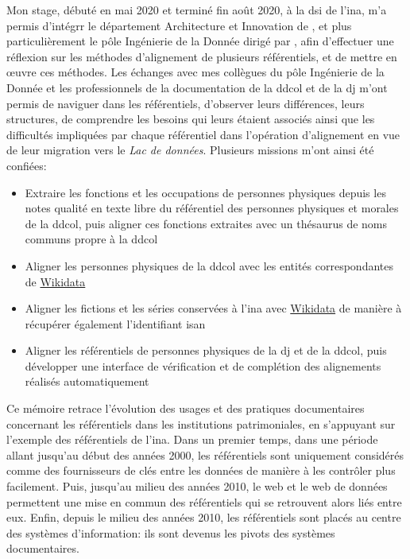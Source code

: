 Mon stage, débuté en mai 2020 et terminé fin août 2020, à la \ac{dsi} de l'\ac{ina}, m'a permis d'intégrr le département \og Architecture et Innovation\fg{} de , et plus particulièrement le pôle \og Ingénierie de la Donnée\fg{} dirigé par , afin d'effectuer une réflexion sur les méthodes d'alignement de plusieurs référentiels, et de mettre en œuvre ces méthodes. Les échanges avec mes collègues du pôle \og Ingénierie de la Donnée\fg{} et les professionnels de la documentation de la \ac{ddcol} et de la \ac{dj} m'ont permis de naviguer dans les référentiels, d'observer leurs différences, leurs structures, de comprendre les besoins qui leurs étaient associés ainsi que les difficultés impliquées par chaque référentiel dans l'opération d'alignement en vue de leur migration vers le \textit{Lac de données}. Plusieurs missions m'ont ainsi été confiées:
\begin{itemize}
	\item Extraire les fonctions et les occupations de personnes physiques depuis les notes qualité en texte libre du référentiel des personnes physiques et morales de la \ac{ddcol}, puis aligner ces fonctions extraites avec un thésaurus de noms communs propre à la \ac{ddcol}
	\item Aligner les personnes physiques de la \ac{ddcol} avec les entités correspondantes de \href{https://www.wikidata.org/}{Wikidata}
	\item Aligner les fictions et les séries conservées à l'\ac{ina} avec \href{https://www.wikidata.org/}{Wikidata} de manière à récupérer également l'identifiant \ac{isan}
	\item Aligner les référentiels de personnes physiques de la \ac{dj} et de la \ac{ddcol}, puis développer une interface de vérification et de complétion des alignements réalisés automatiquement
\end{itemize}
\bigskip

Ce mémoire retrace l'évolution des usages et des pratiques documentaires concernant les référentiels dans les institutions patrimoniales, en s'appuyant sur l'exemple des référentiels de l'\ac{ina}. Dans un premier temps, dans une période allant jusqu'au début des années 2000, les référentiels sont uniquement considérés comme des fournisseurs de clés entre les données de manière à les contrôler plus facilement. Puis, jusqu'au milieu des années 2010, le web et le web de données permettent une mise en commun des référentiels qui se retrouvent alors liés entre eux. Enfin, depuis le milieu des années 2010, les référentiels sont placés au centre des systèmes d'information: ils sont devenus les pivots des systèmes documentaires.


\thispagestyle{empty}
\cleardoublepage